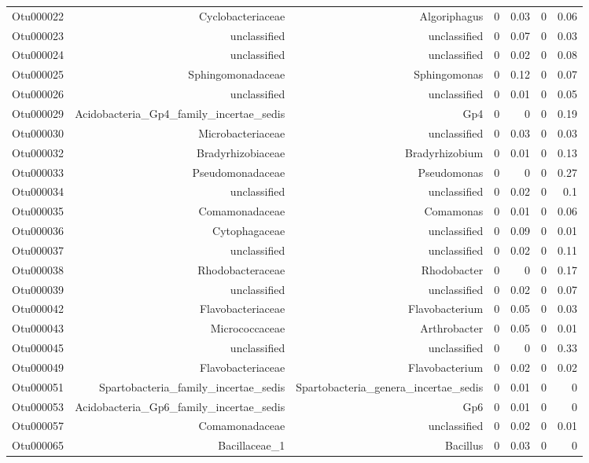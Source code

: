 \begin{table}[ht]
\begin{tabular}{crrrrrr}
  Otu000022 & Cyclobacteriaceae & Algoriphagus & 0 & 0.03 & 0 & 0.06 \\ 
  Otu000023 & unclassified & unclassified & 0 & 0.07 & 0 & 0.03 \\ 
  Otu000024 & unclassified & unclassified & 0 & 0.02 & 0 & 0.08 \\ 
  Otu000025 & Sphingomonadaceae & Sphingomonas & 0 & 0.12 & 0 & 0.07 \\ 
  Otu000026 & unclassified & unclassified & 0 & 0.01 & 0 & 0.05 \\ 
  Otu000029 & Acidobacteria\_Gp4\_family\_incertae\_sedis & Gp4 & 0 & 0 & 0 & 0.19 \\ 
  Otu000030 & Microbacteriaceae & unclassified & 0 & 0.03 & 0 & 0.03 \\ 
  Otu000032 & Bradyrhizobiaceae & Bradyrhizobium & 0 & 0.01 & 0 & 0.13 \\ 
  Otu000033 & Pseudomonadaceae & Pseudomonas & 0 & 0 & 0 & 0.27 \\ 
  Otu000034 & unclassified & unclassified & 0 & 0.02 & 0 & 0.1 \\ 
  Otu000035 & Comamonadaceae & Comamonas & 0 & 0.01 & 0 & 0.06 \\ 
  Otu000036 & Cytophagaceae & unclassified & 0 & 0.09 & 0 & 0.01 \\ 
  Otu000037 & unclassified & unclassified & 0 & 0.02 & 0 & 0.11 \\ 
  Otu000038 & Rhodobacteraceae & Rhodobacter & 0 & 0 & 0 & 0.17 \\ 
  Otu000039 & unclassified & unclassified & 0 & 0.02 & 0 & 0.07 \\ 
  Otu000042 & Flavobacteriaceae & Flavobacterium & 0 & 0.05 & 0 & 0.03 \\ 
  Otu000043 & Micrococcaceae & Arthrobacter & 0 & 0.05 & 0 & 0.01 \\ 
  Otu000045 & unclassified & unclassified & 0 & 0 & 0 & 0.33 \\ 
  Otu000049 & Flavobacteriaceae & Flavobacterium & 0 & 0.02 & 0 & 0.02 \\ 
  Otu000051 & Spartobacteria\_family\_incertae\_sedis & Spartobacteria\_genera\_incertae\_sedis & 0 & 0.01 & 0 & 0 \\ 
  Otu000053 & Acidobacteria\_Gp6\_family\_incertae\_sedis & Gp6 & 0 & 0.01 & 0 & 0 \\ 
  Otu000057 & Comamonadaceae & unclassified & 0 & 0.02 & 0 & 0.01 \\ 
  Otu000065 & Bacillaceae\_1 & Bacillus & 0 & 0.03 & 0 & 0 \\ 

\end{tabular}
\end{table}
